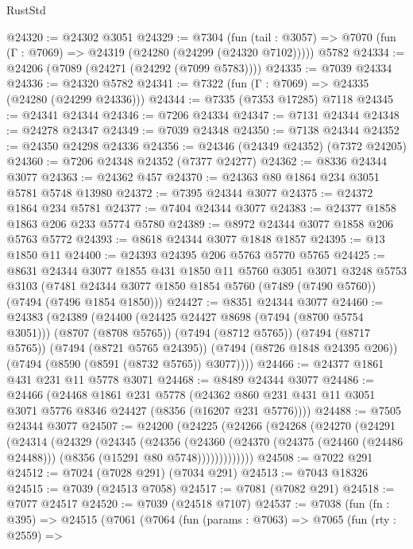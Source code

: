 \begin{lexlean}{RustStd}
\begin{coremodule}
@24320 := @24302 @3051
@24329 := @7304
    (fun (tail : @3057) => @7070 (fun (Γ : @7069) => @24319 (@24280 (@24299 (@24320 @7102)))))
    @5782
@24334 := @24206 (@7089 (@24271 (@24292 (@7099 @5783))))
@24335 := @7039 @24334
@24336 := @24320 @5782
@24341 := @7322 (fun (Γ : @7069) => @24335 (@24280 (@24299 @24336)))
@24344 := @7335 (@7353 @17285) @7118
@24345 := @24341 @24344
@24346 := @7206 @24334
@24347 := @7131 @24344
@24348 := @24278 @24347
@24349 := @7039 @24348
@24350 := @7138 @24344
@24352 := @24350 @24298 @24336
@24356 := @24346 (@24349 @24352) (@7372 @24205)
@24360 := @7206 @24348 @24352 (@7377 @24277)
@24362 := @8336 @24344 @3077
@24363 := @24362 @457
@24370 := @24363 @80 @1864 @234 @3051 @5781 @5748 @13980
@24372 := @7395 @24344 @3077
@24375 := @24372 @1864 @234 @5781
@24377 := @7404 @24344 @3077
@24383 := @24377 @1858 @1863 @206 @233 @5774 @5780
@24389 := @8972 @24344 @3077 @1858 @206 @5763 @5772
@24393 := @8618 @24344 @3077 @1848 @1857
@24395 := @13 @1850 @11
@24400 := @24393 @24395 @206 @5763 @5770 @5765
@24425 := @8631
    @24344
    @3077
    @1855
    @431
    @1850
    @11
    @5760
    @3051
    @3071
    @3248
    @5753
    @3103
    (@7481 @24344 @3077 @1850 @1854 @5760 (@7489 (@7490 @5760)) (@7494 (@7496 @1854 @1850)))
@24427 := @8351 @24344 @3077
@24460 := @24383
    (@24389
      (@24400
        (@24425 @24427 @8698 (@7494 (@8700 @5754 @3051)))
        (@8707 (@8708 @5765))
        (@7494 (@8712 @5765))
        (@7494 (@8717 @5765))
        (@7494 (@8721 @5765 @24395))
        (@7494 (@8726 @1848 @24395 @206))
        (@7494 (@8590 (@8591 (@8732 @5765)) @3077))))
@24466 := @24377 @1861 @431 @231 @11 @5778 @3071
@24468 := @8489 @24344 @3077
@24486 := @24466
    (@24468
      @1861
      @231
      @5778
      (@24362 @860 @231 @431 @11 @3051 @3071 @5776 @8346 @24427 (@8356 (@16207 @231 @5776))))
@24488 := @7505 @24344 @3077
@24507 := @24200
    (@24225
      (@24266
        (@24268
          (@24270
            (@24291
              (@24314
                (@24329
                  (@24345
                    (@24356
                      (@24360
                        (@24370
                          (@24375 (@24460 (@24486 @24488)))
                          (@8356 (@15291 @80 @5748)))))))))))))
@24508 := @7022 @291
@24512 := @7024 (@7028 @291) (@7034 @291)
@24513 := @7043 @18326
@24515 := @7039 (@24513 @7058)
@24517 := @7081 (@7082 @291)
@24518 := @7077 @24517
@24520 := @7039 (@24518 @7107)
@24537 := @7038
    (fun (fn : @395) =>
    @24515
      (@7061
        (@7064
          (fun (params : @7063) =>
          @7065
            (fun (rty : @2559) =>

\end{coremodule}
\end{lexlean}

